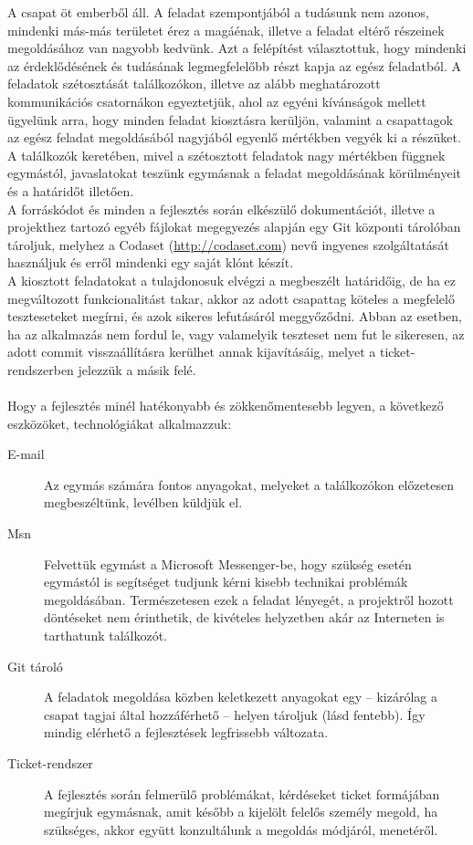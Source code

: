 A csapat öt emberből áll. A feladat szempontjából a tudásunk nem azonos, mindenki más-más területet érez a magáénak, illetve a feladat eltérő részeinek megoldásához van nagyobb kedvünk. Azt a felépítést választottuk, hogy mindenki az érdeklődésének és tudásának legmegfelelőbb részt kapja az egész feladatból. A feladatok szétosztását találkozókon, illetve az alább meghatározott kommunikációs csatornákon egyeztetjük, ahol az egyéni kívánságok mellett ügyelünk arra, hogy minden feladat kiosztásra kerüljön, valamint a csapattagok az egész feladat megoldásából nagyjából egyenlő mértékben vegyék ki a részüket. A találkozók keretében, mivel a szétosztott feladatok nagy mértékben függnek egymástól, javaslatokat teszünk egymásnak a feladat megoldásának körülményeit és a határidőt illetően.\\

A forráskódot és minden a fejlesztés során elkészülő dokumentációt, illetve a projekthez tartozó egyéb fájlokat megegyezés alapján egy Git központi tárolóban tároljuk, melyhez a Codaset (\url{http://codaset.com}) nevű ingyenes szolgáltatását használjuk és erről mindenki egy saját klónt készít.\\

A kiosztott feladatokat a tulajdonosuk elvégzi a megbeszélt határidőig, de ha ez megváltozott funkcionalitást takar, akkor az adott csapattag köteles a megfelelő teszteseteket megírni, és azok sikeres lefutásáról meggyőződni. Abban az esetben, ha az alkalmazás nem fordul le, vagy valamelyik teszteset nem fut le sikeresen, az adott commit visszaállításra kerülhet annak kijavításáig, melyet a ticket-rendszerben jelezzük a másik felé.\\
\\
Hogy a fejlesztés minél hatékonyabb és zökkenőmentesebb legyen, a következő eszközöket, technológiákat alkalmazzuk:
\begin{description}
\item[E-mail] Az egymás számára fontos anyagokat, melyeket a találkozókon előzetesen megbeszéltünk, levélben küldjük el.
\item[Msn] Felvettük egymást a Microsoft Messenger-be, hogy szükség esetén egymástól is segítséget tudjunk kérni kisebb technikai problémák megoldásában. Természetesen ezek a feladat lényegét, a projektről hozott döntéseket nem érinthetik, de kivételes helyzetben akár az Interneten is tarthatunk találkozót.
\item[Git tároló] A feladatok megoldása közben keletkezett anyagokat egy -- kizárólag a csapat tagjai által hozzáférhető -- helyen tároljuk (lásd fentebb). Így mindig elérhető a fejlesztések legfrissebb változata.
\item[Ticket-rendszer] A fejlesztés során felmerülő problémákat, kérdéseket ticket formájában megírjuk egymásnak, amit később a kijelölt felelős személy megold, ha szükséges, akkor együtt konzultálunk a megoldás módjáról, menetéről.
\end{description}

